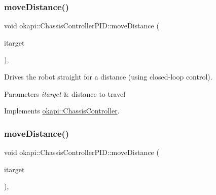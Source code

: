 \subsubsection{\texorpdfstring{moveDistance()}{moveDistance()}\hspace{0.1cm}{\footnotesize\ttfamily [1/2]}}
{\footnotesize\ttfamily void okapi\+::\+Chassis\+Controller\+P\+I\+D\+::move\+Distance (\begin{DoxyParamCaption}\item[{Q\+Length}]{itarget }\end{DoxyParamCaption})\hspace{0.3cm}{\ttfamily [override]}, {\ttfamily [virtual]}}

Drives the robot straight for a distance (using closed-\/loop control).


\begin{DoxyCode}{0}
\DoxyCodeLine{\textcolor{comment}{// Drive forward 6 inches}}
\DoxyCodeLine{}
\DoxyCodeLine{\textcolor{comment}{// Drive backward 0.2 meters}}
\end{DoxyCode}



\begin{DoxyParams}{Parameters}
{\em itarget} & distance to travel \\
\hline
\end{DoxyParams}


Implements \mbox{\hyperlink{classokapi_1_1ChassisController_a6d5b69139dfa8b814d05c74c22bcaa43}{okapi\+::\+Chassis\+Controller}}.

\mbox{\label{classokapi_1_1ChassisControllerPID_a711b80afa09a80233372cc37267606d5}} 
\subsubsection{\texorpdfstring{moveDistance()}{moveDistance()}\hspace{0.1cm}{\footnotesize\ttfamily [2/2]}}
{\footnotesize\ttfamily void okapi\+::\+Chassis\+Controller\+P\+I\+D\+::move\+Distance (\begin{DoxyParamCaption}\item[{double}]{itarget }\end{DoxyParamCaption})\hspace{0.3cm}{\ttfamily [override]}, {\ttfamily [virtual]}}

